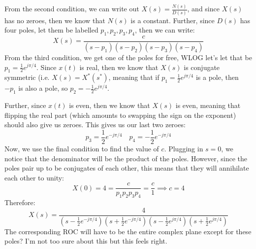 \documentclass[10pt]{article}
\begin{document}
	\begin{solution}
		From the second condition, we can write out \( X(s) = \frac{N(s)}{D(s)} \), and since \( X(s) \) has
		no zeroes, then we know that \( N(s) \) is a constant. Further, since \( D(s) \) has four 
		poles, let them be labelled \( p_1, p_2, p_3, p_4 \), then we can write:
		\[
		X(s) = \frac{c}{(s - p_1)(s - p_2)(s - p_3)(s - p_4)}
		\] 
		From the third condition, we get one of the poles for free, WLOG let's let that be 
		\( p_1 = \frac{1}{2}e^{j \pi / 4} \). Since \( x(t)  \) is real, then we know that \( X(s)  \) 
		is conjugate symmetric (i.e. \( X(s) = X^{*}(s^{*}) \), meaning that if \( p_1 =\frac{1}{2} e^{j \pi / 4} \)
		is a pole, then \( -p_1 \) is also a pole, so \( p_2 = -\frac{1}{2}e^{j \pi / 4} \).

		Further, since \( x(t) \) is even, then we know that \( X(s) \) is even, meaning that flipping the real 
		part (which amounts to swapping the sign on the exponent) should also give us zeroes. This gives us 
		our last two zeroes: 
		\[
		p_3 = \frac{1}{2}e^{- j \pi / 4} \quad p_4 = -\frac{1}{2}e^{- j \pi /4}
		\] 
		Now, we use the final condition to find the value of \( c \). Plugging in \( s = 0 \), we notice that 
		the denominator will be the product of the poles. However, since the poles pair up to be conjugates of each 
		other, this means that they will annihilate each other to unity:
		\[
		X(0) = 4 = \frac{c}{p_1 p_2 p_3 p_4} = \frac{c}{1} \implies c= 4
		\] 
		Therefore:
		\[
		X(s) = \frac{4}{(s - \frac{1}{2}e^{- j \pi / 4})(s + \frac{1}{2}e^{- j \pi / 4})(s - \frac{1}{2}e^{j \pi / 4})
		(s + \frac{1}{2}e^{j \pi / 4})}
		\] 
		The corresponding ROC will have to be the entire complex plane except for these poles? I'm not too sure about 
		this but this feels right. 
	\end{solution}
	\pagebreak
\end{document}
